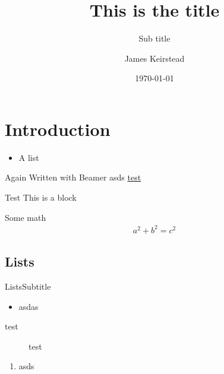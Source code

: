 
\title{This is the title}
\subtitle{Sub title}
\date{\today}
\author{James Keirstead}

\usepackage{lipsum}
\usepackage{amsmath}



\begin{frame}
\maketitle
\end{frame}

\section{Introduction}

\lipsum[1]

\begin{itemize}
\item A list 
\end{itemize}

\begin{frame}{Again}
Written with Beamer \citep{Tantau_2004} \pause
asds \url{test}

\begin{block}{Test}
This is a block
\end{block}

Some math
\begin{align*}
a^2 + b^2 = c^2
\end{align*}
\end{frame}

\lipsum[2]

\subsection{Lists}

\begin{frame}{Lists}{Subtitle}
\begin{itemize}
\item asdas
\end{itemize}

\begin{description}
\item [test] test
\end{description}

\begin{enumerate}
\item asds
\end{enumerate}
\end{frame}



